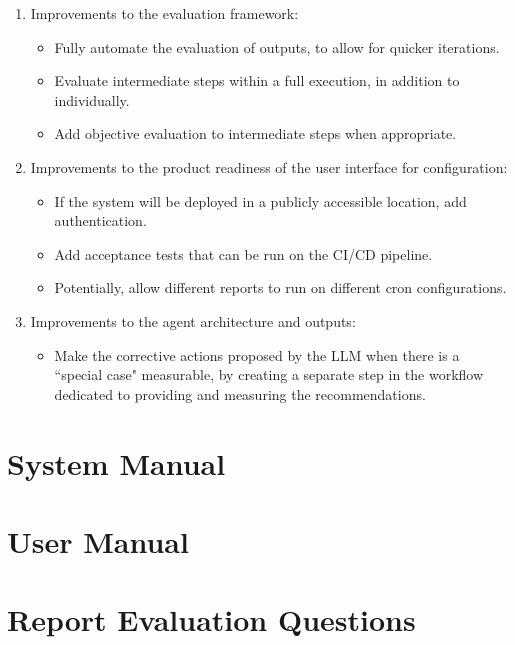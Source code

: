 \documentclass[a4paper]{report}
\begin{document}
\begin{enumerate}
    \item Improvements to the evaluation framework:
    \begin{itemize}
        \item Fully automate the evaluation of outputs, to allow for quicker iterations.
        \item Evaluate intermediate steps within a full execution, in addition to individually.
        \item Add objective evaluation to intermediate steps when appropriate.
    \end{itemize}
    \item Improvements to the product readiness of the user interface for configuration:
    \begin{itemize}
        \item If the system will be deployed in a publicly accessible location, add authentication.
        \item Add acceptance tests that can be run on the CI/CD pipeline.
        \item Potentially, allow different reports to run on different cron configurations.
    \end{itemize}
    \item Improvements to the agent architecture and outputs:
    \begin{itemize}
        \item Make the corrective actions proposed by the LLM when there is a ``special case" measurable, by creating a separate step in the workflow dedicated to providing and measuring the recommendations.
    \end{itemize}
\end{enumerate}

\appendix

\printbibliography

\chapter{System Manual}

\chapter{User Manual}

\chapter{Report Evaluation Questions}
\label{annex:evaluation}
\end{document}
